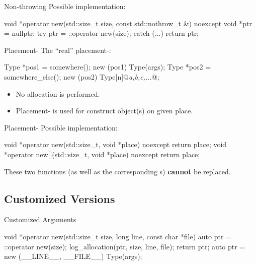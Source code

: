 \documentclass{beamer}
\begin{document}
\begin{frame}[fragile]{Non-throwing }
  Possible implementation:
  \begin{cpp}
void *operator new(std::size_t size,
                   const std::nothrow_t &) noexcept {
  void *ptr = nullptr;
  try {
    ptr = ::operator new(size);
  } catch (...) {}
  return ptr;
}
  \end{cpp}
\end{frame}

\begin{frame}[fragile]{Placement-}
  The ``real'' placement-:
  \begin{cpp}
Type *pos1 = somewhere();
new (pos1) Type(args);
Type *pos2 = somewhere_else();
new (pos2) Type[n]{@\textit{a,b,c,...}@};
  \end{cpp}
  \begin{itemize}
    \item No allocation is performed.
    \item Placement- is used for construct object(s) on given place.
  \end{itemize}
\end{frame}

\begin{frame}[fragile]{Placement-}
  Possible implementation:
  \begin{cpp}
void *operator new(std::size_t, void *place) noexcept {
  return place;
}
void *operator new[](std::size_t, void *place) noexcept {
  return place;
}
  \end{cpp}
  \begin{notice}
    These two functions (as well as the corresponding s) \textbf{cannot} be replaced.
  \end{notice}
\end{frame}

\subsection{Customized Versions}

\begin{frame}[fragile]{Customized Arguments}
  \begin{cpp}
void *operator new(std::size_t size,
                   long line, const char *file) {
  auto ptr = ::operator new(size);
  log_allocation(ptr, size, line, file);
  return ptr;
}
auto ptr = new (__LINE__, __FILE__) Type(args);
  \end{cpp}
\end{frame}
\end{document}

